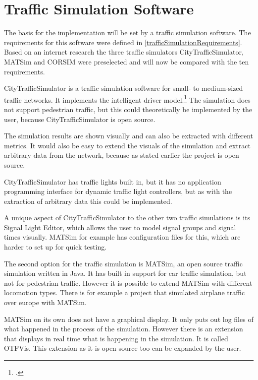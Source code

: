 \section{Traffic Simulation Software}

The basis for the implementation will be set by a traffic simulation software. The requirements for this software were defined in \ref{trafficSimulationRequirements}. Based on an internet research the three traffic simulators CityTrafficSimulator, MATSim and CORSIM were preselected and will now be compared with the ten requirements.

CityTrafficSimulator is a traffic simulation software for small- to medium-sized traffic networks. It implements the intelligent driver model.\footcite{citation needed (traffic-simulation.de)} The simulation does not support pedestrian traffic, but this could theoretically be implemented by the user, because CityTrafficSimulator is open source.

The simulation results are shown visually and can also be extracted with different metrics. It would also be easy to extend the visuals of the simulation and extract arbitrary data from the network, because as stated earlier the project is open source.

CityTrafficSimulator has traffic lights built in, but it has no application programming interface for dynamic traffic light controllers, but as with the extraction of arbitrary data this could be implemented.

A unique aspect of CityTrafficSimulator to the other two traffic simulations is its Signal Light Editor, which allows the user to model signal groups and signal times visually. MATSim for example has configuration files for this, which are harder to set up for quick testing.

The second option for the traffic simulation is MATSim, an open source traffic simulation written in Java. It has built in support for car traffic simulation, but not for pedestrian traffic. However it is possible to extend MATSim with different locomotion types. There is for example a project that simulated airplane traffic over europe with MATSim.

MATSim on its own does not have a graphical display. It only puts out log files of what happened in the process of the simulation. However there is an extension that displays in real time what is happening in the simulation. It is called OTFVis. This extension as it is open source too can be expanded by the user.

